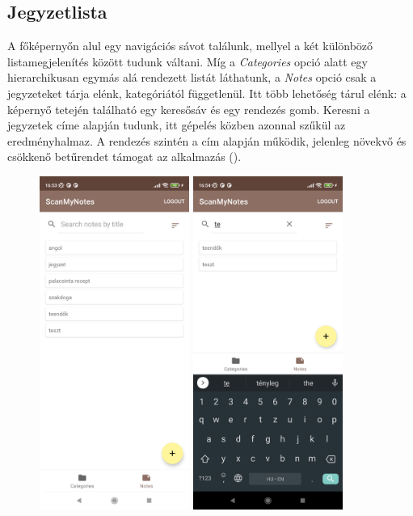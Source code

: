 \subsection{Jegyzetlista}
A főképernyőn alul egy navigációs sávot találunk, mellyel a két különböző listamegjelenítés között tudunk váltani. Míg a \emph{Categories} opció alatt egy hierarchikusan egymás alá rendezett listát láthatunk, a \emph{Notes} opció csak a jegyzeteket tárja elénk, kategóriától függetlenül. Itt több lehetőség tárul elénk: a képernyő tetején található egy keresősáv és egy rendezés gomb. Keresni a jegyzetek címe alapján tudunk, itt gépelés közben azonnal szűkül az eredményhalmaz. A rendezés szintén a cím alapján működik, jelenleg növekvő és csökkenő betűrendet támogat az alkalmazás ().

\begin{figure}[!ht]
	\centering
	\includegraphics[width=49mm, keepaspectratio]{figures/notelist_full.jpg}
	\includegraphics[width=49mm, keepaspectratio]{figures/notelist_search.jpg}

\end{figure}
